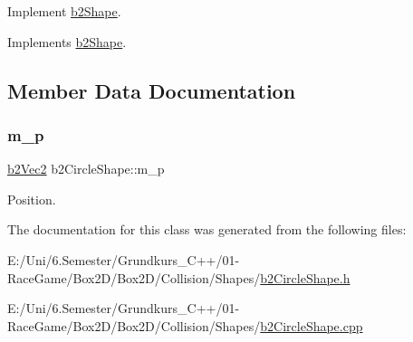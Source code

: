 Implement \mbox{\hyperlink{classb2_shape}{b2\+Shape}}. 



Implements \mbox{\hyperlink{classb2_shape_a6ac968e403e2d93e8ae46d728a2e50fa}{b2\+Shape}}.



\subsection{Member Data Documentation}
\mbox{\label{classb2_circle_shape_a190705618b2e65f636f1dc03c63640ff}} 
\subsubsection{\texorpdfstring{m\_p}{m\_p}}
{\footnotesize\ttfamily \mbox{\hyperlink{structb2_vec2}{b2\+Vec2}} b2\+Circle\+Shape\+::m\+\_\+p}



Position. 



The documentation for this class was generated from the following files\+:\begin{DoxyCompactItemize}
\item 
E\+:/\+Uni/6.\+Semester/\+Grundkurs\+\_\+\+C++/01-\/\+Race\+Game/\+Box2\+D/\+Box2\+D/\+Collision/\+Shapes/\mbox{\hyperlink{b2_circle_shape_8h}{b2\+Circle\+Shape.\+h}}\item 
E\+:/\+Uni/6.\+Semester/\+Grundkurs\+\_\+\+C++/01-\/\+Race\+Game/\+Box2\+D/\+Box2\+D/\+Collision/\+Shapes/\mbox{\hyperlink{b2_circle_shape_8cpp}{b2\+Circle\+Shape.\+cpp}}\end{DoxyCompactItemize}
